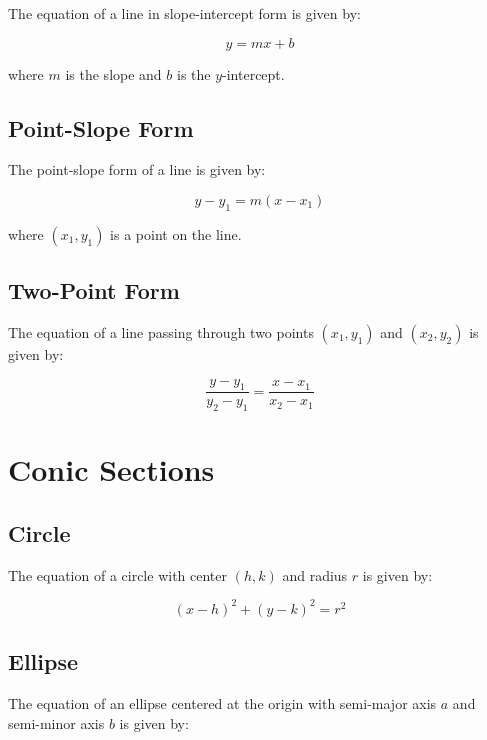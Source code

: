 \documentclass{article}
\begin{document}
The equation of a line in slope-intercept form is given by:

\begin{equation}
    y = mx + b
\end{equation}

where $m$ is the slope and $b$ is the $y$-intercept.

\subsection{Point-Slope Form}

The point-slope form of a line is given by:

\begin{equation}
    y - y_1 = m(x - x_1)
\end{equation}

where $(x_1, y_1)$ is a point on the line.

\subsection{Two-Point Form}

The equation of a line passing through two points $(x_1, y_1)$ and $(x_2, y_2)$ is given by:

\begin{equation}
    \frac{y - y_1}{y_2 - y_1} = \frac{x - x_1}{x_2 - x_1}
\end{equation}

\section{Conic Sections}

\subsection{Circle}

The equation of a circle with center $(h, k)$ and radius $r$ is given by:

\begin{equation}
    (x - h)^2 + (y - k)^2 = r^2
\end{equation}

\subsection{Ellipse}

The equation of an ellipse centered at the origin with semi-major axis $a$ and semi-minor axis $b$ is given by:
\end{document}
